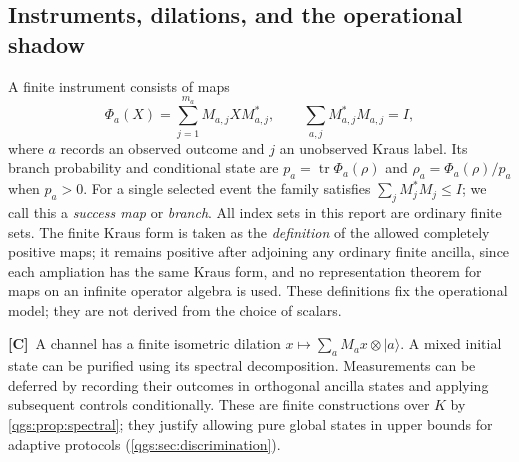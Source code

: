 \documentclass[11pt,oneside]{article}
\numberwithin{equation}{section}
\theoremstyle{plain}
\theoremstyle{definition}
\theoremstyle{remark}
\DeclareMathOperator{\tr}{tr}
\newcommand{\ket}[1]{\lvert#1\rangle}
\newcommand{\TC}{\textcolor{TierC}{\textsf{\bfseries[C]}}}
\begin{document}
\subsection{Instruments, dilations, and the operational shadow}\label{qgs:sec:instruments}
A finite instrument consists of maps
\begin{equation}\label{qgs:eq:kraus}
 \Phi_a(X)=\sum_{j=1}^{m_a}M_{a,j}XM_{a,j}^*,
 \qquad \sum_{a,j}M_{a,j}^*M_{a,j}=I,
\end{equation}
where $a$ records an observed outcome and $j$ an unobserved Kraus label. Its branch probability and conditional state are $p_a=\tr\Phi_a(\rho)$ and $\rho_a=\Phi_a(\rho)/p_a$ when $p_a>0$. For a single selected event the family satisfies $\sum_jM_j^*M_j\le I$; we call this a \emph{success map} or \emph{branch}. All index sets in this report are ordinary finite sets. The finite Kraus form is taken as the \emph{definition} of the allowed completely positive maps; it remains positive after adjoining any ordinary finite ancilla, since each ampliation has the same Kraus form, and no representation theorem for maps on an infinite operator algebra is used. These definitions fix the operational model; they are not derived from the choice of scalars.

\TC\ A channel has a finite isometric dilation $x\mapsto\sum_aM_ax\otimes\ket a$. A mixed initial state can be purified using its spectral decomposition. Measurements can be deferred by recording their outcomes in orthogonal ancilla states and applying subsequent controls conditionally. These are finite constructions over $K$ by \cref{qgs:prop:spectral}; they justify allowing pure global states in upper bounds for adaptive protocols (\cref{qgs:sec:discrimination}).
\end{document}
